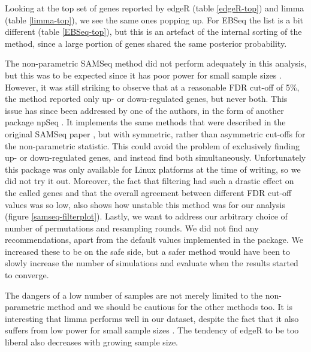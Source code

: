 \documentclass[a4paper,10pt]{article}\usepackage[]{graphicx}\usepackage[]{color}
\begin{document}
Looking at the top set of genes reported by edgeR (table \ref{edgeR-top}) and limma (table \ref{limma-top}), we see the same ones popping up. For EBSeq the list is a bit different (table \ref{EBSeq-top}), but this is an artefact of the internal sorting of the method, since a large portion of genes shared the same posterior probability.

% 
% 

The non-parametric SAMSeq method did not perform adequately in this analysis, but this was to be expected since it has poor power for small sample sizes \autocite{seyednasrollah_comparison_2015,soneson_comparison_2013}. However, it was still striking to observe that at a reasonable FDR cut-off of 5\%, the method reported only up- or down-regulated genes, but never both. This issue has since been addressed by one of the authors, in the form of another package npSeq \autocite{li2011using}. It implements the same methods that were described in the original SAMSeq paper \autocite{li_finding_2013}, but with symmetric, rather than asymmetric cut-offs for the non-parametric statistic. This could avoid the problem of exclusively finding up- or down-regulated genes, and instead find both simultaneously. Unfortunately this package was only available for Linux platforms at the time of writing, so we did not try it out.
Moreover, the fact that filtering had such a drastic effect on the called genes and that the overall agreement between different FDR cut-off values was so low, also shows how unstable this method was for our analysis (figure \ref{samseq-filterplot}). Lastly, we want to address our arbitrary choice of number of permutations and resampling rounds. We did not find any recommendations, apart from the default values implemented in the package. We increased these to be on the safe side, but a safer method would have been to slowly increase the number of simulations and evaluate when the results started to converge. 

The dangers of a low number of samples are not merely limited to the non-parametric method and we should be cautious for the other methods too. It is interesting that limma performs well in our dataset, despite the fact that it also suffers from low power for small sample sizes \autocite{soneson_comparison_2013}. The tendency of edgeR to be too liberal also decreases with growing sample size. 
\end{document}
